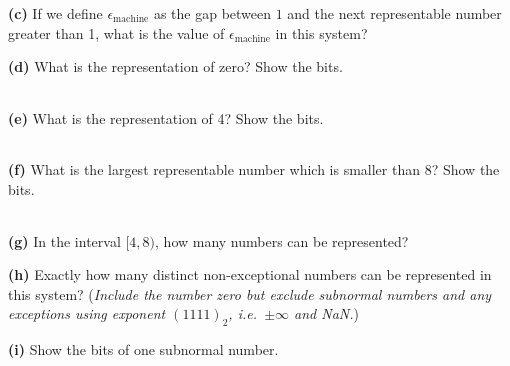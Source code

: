 \documentclass[12pt]{amsart}
\newcommand{\eps}{\epsilon}
\newcommand{\epart}[1]{\bigskip\noindent\textbf{(#1)}\quad }
\newcommand{\bitboxes}{
\large
\begin{center}
\begin{tabular}{|c|c|c|c|c|c|c|c|c|c|c|c|} \hline
\phantom{$e_1$} &
\phantom{$e_1$} &
\phantom{$e_1$} &
\phantom{$e_1$} &
\phantom{$e_1$} &
\phantom{$e_1$} &
\phantom{$e_1$} &
\phantom{$e_1$} &
\phantom{$e_1$} &
\phantom{$e_1$} &
\phantom{$e_1$} &
\phantom{$e_1$} \\ \hline
\end{tabular}
\end{center}
\normalsize}
\begin{document}
\bitboxes
\vfill

\epart{c}  If we define $\eps_{\text{machine}}$ as the gap between $1$ and the next representable number greater than 1, what is the value of $\eps_{\text{machine}}$ in this system?
\vfill

\newpage
\epart{d}  What is the representation of zero?  Show the bits.

\bitboxes
\vfill

\epart{e}  What is the representation of 4?  Show the bits.

\bitboxes
\vfill

\epart{f}  What is the largest representable number which is smaller than 8?  Show the bits.

\bitboxes
\vfill

\epart{g}  In the interval $[4,8)$, how many numbers can be represented?
\vfill

\epart{h}  Exactly how many distinct non-exceptional numbers can be represented in this system?  (\emph{Include the number zero but exclude subnormal numbers and any exceptions using exponent $(1111)_2$, i.e.~$\pm\infty$ and NaN.})
\vfill

\epart{i}  Show the bits of one subnormal number.

\bitboxes
\vspace{0.6in}
\end{document}
